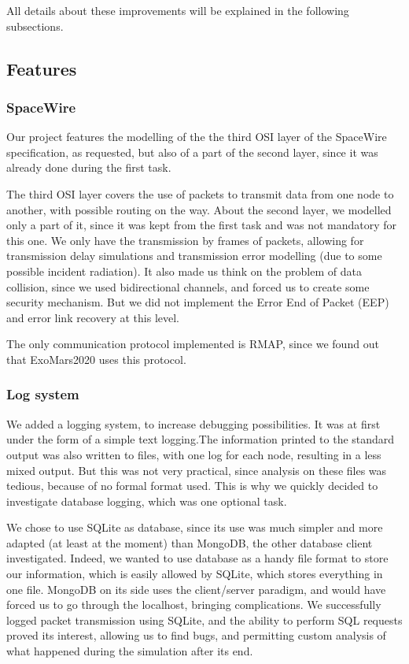 \documentclass[12pt,a4paper]{article}
\begin{document}
All details about these improvements will be explained in the following subsections.

\subsection{Features}
\subsubsection*{SpaceWire}
Our project features the modelling of the the third OSI layer of the SpaceWire specification, as requested, but also of a part of the second layer, since it was already done during the first task.

The third OSI layer covers the use of packets to transmit data from one node to another, with possible routing on the way. About the second layer, we modelled only a part of it, since it was kept from the first task and was not mandatory for this one. We only have the transmission by frames of packets, allowing for transmission delay simulations and transmission error modelling (due to some possible incident radiation). It also made us think on the problem of data collision, since we used bidirectional channels, and forced us to create some security mechanism. But we did not implement the Error End of Packet (EEP) and error link recovery at this level.

The only communication protocol implemented is RMAP, since we found out that ExoMars2020 uses this protocol.
\subsubsection*{Log system}
We added a logging system, to increase debugging possibilities. It was at first under the form of a simple text logging.The information printed to the standard output was also written to files, with one log for each node, resulting in a less mixed output. But this was not very practical, since analysis on these files was tedious, because of no formal format used. This is why we quickly decided to investigate database logging, which was one optional task.

We chose to use SQLite as database, since its use was much simpler and more adapted (at least at the moment) than MongoDB, the other database client investigated. Indeed, we wanted to use database as a handy file format to store our information, which is easily allowed by SQLite, which stores everything in one file. MongoDB on its side uses the client/server paradigm, and would have forced us to go through the localhost, bringing complications. We successfully logged packet transmission using SQLite, and the ability to perform SQL requests proved its interest, allowing us to find bugs, and permitting custom analysis of what happened during the simulation after its end.
\end{document}
